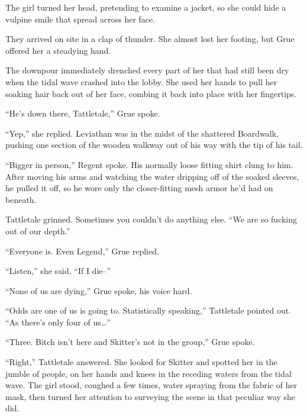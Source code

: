 The girl turned her head, pretending to examine a jacket, so she could hide a vulpine smile that spread across her face.



\sectionbreak



They arrived on site in a clap of thunder.  She almost lost her footing, but Grue offered her a steadying hand.



The downpour immediately drenched every part of her that had still been dry when the tidal wave crashed into the lobby.  She used her hands to pull her soaking hair back out of her face, combing it back into place with her fingertips.



``He's down there, Tattletale,'' Grue spoke.



``Yep,'' she replied.  Leviathan was in the midst of the shattered Boardwalk, pushing one section of the wooden walkway out of his way with the tip of his tail.



``Bigger in person,'' Regent spoke.  His normally loose fitting shirt clung to him.  After moving his arms and watching the water dripping off of the soaked sleeves, he pulled it off, so he wore only the closer-fitting mesh armor he'd had on beneath.



Tattletale grinned.  Sometimes you couldn't do anything else.  ``We are so fucking out of our depth.''



``Everyone is.  Even Legend,'' Grue replied.



``Listen,'' she said, ``If I die--''



``None of us are dying,'' Grue spoke, his voice hard.



``Odds are one of us is going to.  Statistically speaking,'' Tattletale pointed out.  ``As there's only four of us\ldots''



``Three.  Bitch isn't here and Skitter's not in the group,'' Grue spoke.



``Right,'' Tattletale answered.  She looked for Skitter and spotted her in the jumble of people, on her hands and knees in the receding waters from the tidal wave.  The girl stood, coughed a few times, water spraying from the fabric of her mask, then turned her attention to surveying the scene in that peculiar way she did.



